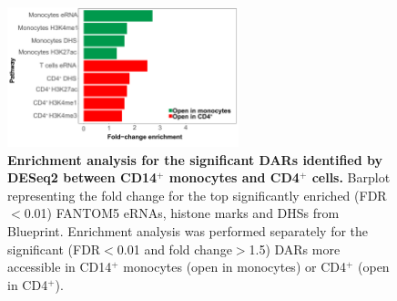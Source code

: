 \begin{figure}[h]
\centering
\includegraphics[width=0.6\textwidth]{./Results1/pdfs/ATAC_CD4vsCD14_deseq_features_enrichment_barplot}
\caption[Enrichment analysis for the significant DARs identified by DESeq2 between CD14$^+$ monocytes and CD4$^+$ cells.]{\textbf{Enrichment analysis for the significant DARs identified by DESeq2 between CD14$^+$ monocytes and CD4$^+$ cells.} Barplot representing the fold change for the top significantly enriched (FDR$<$0.01) FANTOM5 eRNAs, histone marks and DHSs from Blueprint. Enrichment analysis was performed separately for the significant (FDR$<$0.01 and fold change$>$1.5) DARs more accessible in CD14$^+$ monocytes (open in monocytes) or CD4$^+$ (open in CD4$^+$).}
\label{figure:Enrichment_analysis_of_DARs_by_DESeq2}
\end{figure} 



%

